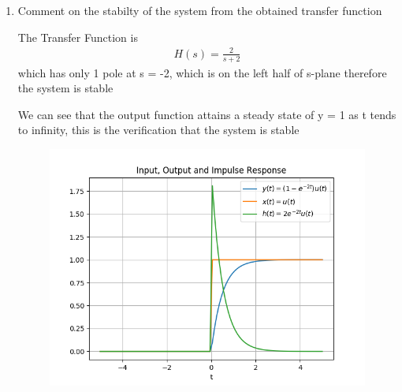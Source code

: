 \begin{enumerate}[label=\thesection.\arabic*.,ref=\thesection.\theenumi]
\item Comment on the stabilty of the system from the obtained transfer function

\solution
The Transfer Function is 
\begin{align}
H(s) = \frac{2}{s+2}
\end{align}
which has only 1 pole at s = -2, which is on the left half of s-plane therefore the system is stable

We can see that the output function attains a steady state of y = 1 as t tends to infinity, this is the verification that the system is stable

\begin{figure}
\centering
\includegraphics[width=\columnwidth]{figs/EE18BTECH11021_fig.png}
\end{figure}
\end{enumerate}
